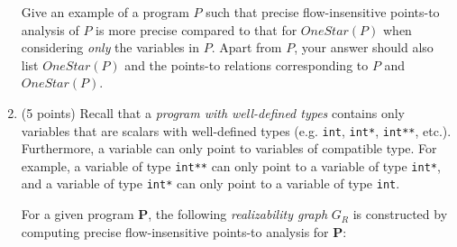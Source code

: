 \documentclass[12pt]{article}
\begin{document}
\begin{enumerate}
      Give an example of a program $P$ such that precise flow-insensitive
      points-to analysis of $P$ is more precise compared to that for
      $OneStar(P)$ when considering \emph{only} the variables in $P$. Apart from
      $P$, your answer should also list $OneStar(P)$ and the points-to relations
      corresponding to $P$ and $OneStar(P)$.
      
      \begin{mdframed}
        \vspace{2em}
      \end{mdframed}

      \item (5 points) Recall that a \emph{program with well-defined types}
      contains only variables that are scalars with well-defined types (e.g.
      \lstinline$int$, \lstinline$int*$, \lstinline$int**$, etc.). Furthermore,
      a variable can only point to variables of compatible type. For example, a
      variable of type \lstinline$int**$ can only point to a variable of type
      \lstinline$int*$, and a variable of type \lstinline$int*$ can only point
      to a variable of type \lstinline$int$.
      
      For a given program \textbf{P}, the following \emph{realizability graph}
      $G_R$ is constructed by computing precise flow-insensitive points-to
      analysis for \textbf{P}:
      \vspace{-2ex}
      \begin{center}
\end{center}
\end{enumerate}
\end{document}
